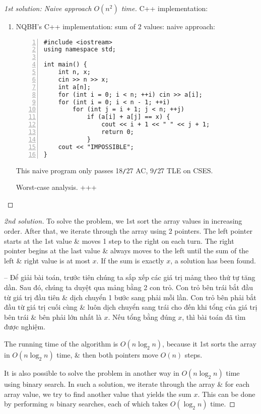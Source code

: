 \documentclass{article}
\begin{document}
\begin{proof}[1st solution: Naive approach $O(n^2)$ time]
    C++ implementation:
    \begin{enumerate}
        \item NQBH's C++ implementation: sum of 2 values: naive approach:
        \begin{Verbatim}[numbers=left,xleftmargin=5mm]
#include <iostream>
using namespace std;

int main() {
    int n, x;
    cin >> n >> x;
    int a[n];
    for (int i = 0; i < n; ++i) cin >> a[i];
    for (int i = 0; i < n - 1; ++i)
        for (int j = i + 1; j < n; ++j)
            if (a[i] + a[j] == x) {
                cout << i + 1 << " " << j + 1;
                return 0;
            }
    cout << "IMPOSSIBLE";
}
        \end{Verbatim}
        This naive program only passes 18{\tt/}27 AC, 9{\tt/}27 TLE on CSES.

        {\sf Worst-case analysis.} +++
    \end{enumerate}
\end{proof}

\begin{proof}[2nd solution]
    To solve the problem, we 1st sort the array values in increasing order. After that, we iterate through the array using 2 pointers. The left pointer starts at the 1st value \& moves 1 step to the right on each turn. The right pointer begins at the last value \& always moves to the left until the sum of the left \& right value is at most $x$. If the sum is exactly $x$, a solution has been found.

    -- Để giải bài toán, trước tiên chúng ta sắp xếp các giá trị mảng theo thứ tự tăng dần. Sau đó, chúng ta duyệt qua mảng bằng 2 con trỏ. Con trỏ bên trái bắt đầu từ giá trị đầu tiên \& dịch chuyển 1 bước sang phải mỗi lần. Con trỏ bên phải bắt đầu từ giá trị cuối cùng \& luôn dịch chuyển sang trái cho đến khi tổng của giá trị bên trái \& bên phải lớn nhất là $x$. Nếu tổng bằng đúng $x$, thì bài toán đã tìm được nghiệm.

    The running time of the algorithm is $O(n\log_2n)$, because it 1st sorts the array in $O(n\log_2n)$ time, \& then both pointers move $O(n)$ steps.

    It is also possible to solve the problem in another way in $O(n\log_2n)$ time using binary search. In such a solution, we iterate through the array \& for each array value, we try to find another value that yields the sum $x$. This can be done by performing $n$ binary searches, each of which takes $O(\log_2n)$ time.
\end{proof}
\end{document}
